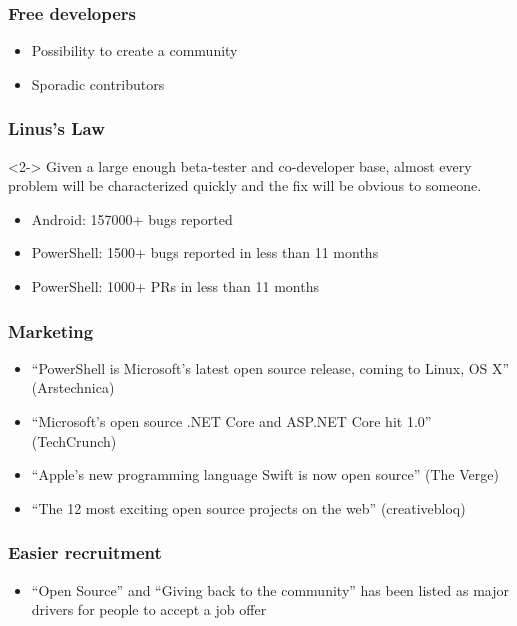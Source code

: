 \documentclass[t,aspectratio=169]{beamer}
\begin{document}
\begin{frame}
    \frametitle{Free developers}
    \begin{itemize}
        \item<2-> Possibility to create a community
        \item<3-> Sporadic contributors
    \end{itemize}
\end{frame}

\begin{frame}
    \frametitle{Linus's Law}
    \begin{definition}<2->
        Given a large enough beta-tester and co-developer base, almost every problem will be characterized quickly and the fix will be obvious to someone.
    \end{definition}
    \begin{itemize}
        \item<3-> Android: 157000+ bugs reported
        \item<4-> PowerShell: 1500+ bugs reported in less than 11 months
        \item<5-> PowerShell: 1000+ PRs in less than 11 months
    \end{itemize}
\end{frame}

\begin{frame}
    \frametitle{Marketing}
    \begin{itemize}
        \item<2-> ``PowerShell is Microsoft’s latest open source release, coming to Linux, OS X'' (Arstechnica)
        \item<3-> ``Microsoft’s open source .NET Core and ASP.NET Core hit 1.0'' (TechCrunch)
        \item<4-> ``Apple's new programming language Swift is now open source'' (The Verge) 
        \item<5-> ``The 12 most exciting open source projects on the web'' (creativebloq)
    \end{itemize}
\end{frame}

\begin{frame}
    \frametitle{Easier recruitment}
    \begin{itemize}
        \item<2-> ``Open Source'' and ``Giving back to the community'' has been listed as major drivers for people to accept a job offer
    \end{itemize}
\end{frame}
\end{document}
